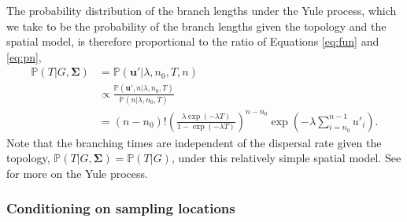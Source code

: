 \documentclass[12pt]{article}
\begin{document}
The probability distribution of the branch lengths under the Yule process, which we take to be the probability of the branch lengths given the topology and the spatial model, is therefore proportional to the ratio of Equations \eqref{eq:fun} and \eqref{eq:pn},
%
\begin{equation}\label{eq:pTSigma}
\begin{aligned}
\mathbb{P}(T | G, \mathbf{\Sigma}) &= \mathbb{P}(\mathbf{u'} | \lambda,n_0,T,n) \\
& \propto \frac{\mathbb{P}(\mathbf{u}', n | \lambda, n_0, T)}{\mathbb{P}(n|\lambda,n_0,T)} \\
& = (n-n_0)! \left(\frac{\lambda \exp(-\lambda T)}{1-\exp(-\lambda T)}\right)^{n-n_0} \exp\left(-\lambda \sum_{i=n_0}^{n-1}u'_i \right).
\end{aligned}
\end{equation}
Note that the branching times are independent of the dispersal rate given the topology, $\mathbb{P}(T | G, \mathbf{\Sigma})=\mathbb{P}(T | G)$, under this relatively simple spatial model.
See \cite{edwards1970estimation,rannala1996probability,meligkotsidou2007postprocessing} for more on the Yule process.

\subsubsection*{Conditioning on sampling locations}
\end{document}
